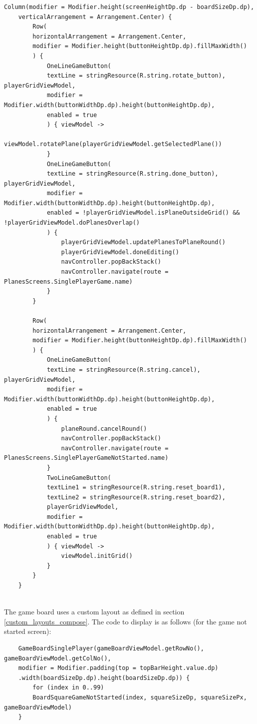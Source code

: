 \begin{lstlisting}
Column(modifier = Modifier.height(screenHeightDp.dp - boardSizeDp.dp),
	verticalArrangement = Arrangement.Center) {
		Row(
		horizontalArrangement = Arrangement.Center,
		modifier = Modifier.height(buttonHeightDp.dp).fillMaxWidth()
		) {
			OneLineGameButton(
			textLine = stringResource(R.string.rotate_button), playerGridViewModel,
			modifier = Modifier.width(buttonWidthDp.dp).height(buttonHeightDp.dp),
			enabled = true
			) { viewModel ->
				viewModel.rotatePlane(playerGridViewModel.getSelectedPlane())
			}
			OneLineGameButton(
			textLine = stringResource(R.string.done_button), playerGridViewModel,
			modifier = Modifier.width(buttonWidthDp.dp).height(buttonHeightDp.dp),
			enabled = !playerGridViewModel.isPlaneOutsideGrid() && !playerGridViewModel.doPlanesOverlap()
			) {
				playerGridViewModel.updatePlanesToPlaneRound()
				playerGridViewModel.doneEditing()
				navController.popBackStack()
				navController.navigate(route = PlanesScreens.SinglePlayerGame.name)
			}
		}
		
		Row(
		horizontalArrangement = Arrangement.Center,
		modifier = Modifier.height(buttonHeightDp.dp).fillMaxWidth()
		) {
			OneLineGameButton(
			textLine = stringResource(R.string.cancel), playerGridViewModel,
			modifier = Modifier.width(buttonWidthDp.dp).height(buttonHeightDp.dp),
			enabled = true
			) {
				planeRound.cancelRound()
				navController.popBackStack()
				navController.navigate(route = PlanesScreens.SinglePlayerGameNotStarted.name)
			}
			TwoLineGameButton(
			textLine1 = stringResource(R.string.reset_board1),
			textLine2 = stringResource(R.string.reset_board2),
			playerGridViewModel,
			modifier = Modifier.width(buttonWidthDp.dp).height(buttonHeightDp.dp),
			enabled = true
			) { viewModel ->
				viewModel.initGrid()
			}
		}
	}
	
\end{lstlisting}

The game board uses a custom layout as defined in section \ref{custom_layouts_compose}. The code to display is as follows (for the game not started screen):

\begin{lstlisting}
	GameBoardSinglePlayer(gameBoardViewModel.getRowNo(), gameBoardViewModel.getColNo(),
	modifier = Modifier.padding(top = topBarHeight.value.dp)
	.width(boardSizeDp.dp).height(boardSizeDp.dp)) {
		for (index in 0..99)
		BoardSquareGameNotStarted(index, squareSizeDp, squareSizePx, gameBoardViewModel)
	}
\end{lstlisting}

